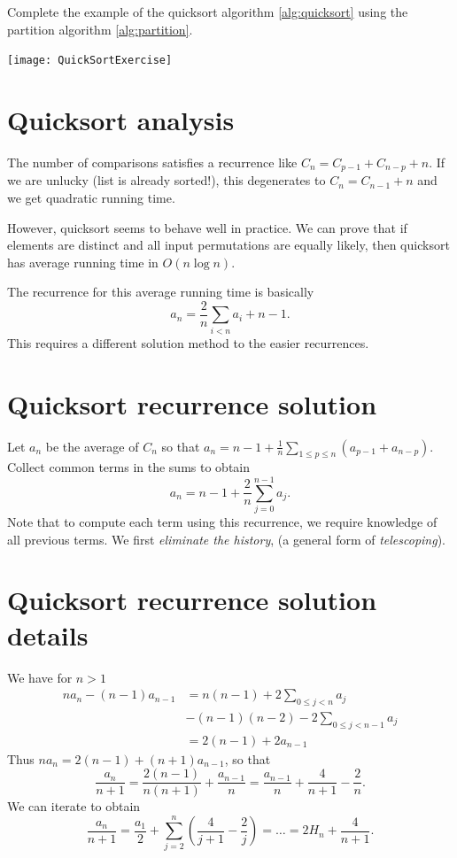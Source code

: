 \begin{Boxample}[2]
Complete the example of the quicksort algorithm \cref{alg:quicksort} using the partition algorithm \cref{alg:partition}.
\begin{center}
\texttt{[image: QuickSortExercise]}
\end{center}
\end{Boxample}

\section{Quicksort analysis}

The number of comparisons satisfies a recurrence like 
$C_n = C_{p-1} + C_{n - p} + n$. If we are unlucky (list is already sorted!), this degenerates to 
$C_{n} = C_{n-1} + n$ and we get quadratic running time.

However, quicksort seems to behave well in practice. We can prove that 
if elements are distinct and all input permutations are equally likely, then 
quicksort has average running time in $O(n \log n)$.

The recurrence for this average running time is basically
$$ a_n = \frac{2}{n} \sum_{i<n} a_i + n-1. $$ 
This requires a different solution method to the easier recurrences.

\section{Quicksort recurrence solution}
Let $a_n$ be the average of $C_n$ so that 
$a_n = n - 1 + \frac{1}{n} \sum_{1\leq p \leq n} (a_{p-1} + a_{n-p})$. 
Collect common terms in the sums to obtain
$$a_n = n - 1 + \frac{2}{n} \sum_{j=0}^{n-1} a_j.$$ 
Note that to compute each term using this recurrence, we require knowledge of all previous terms.
We first \emph{eliminate the history}, (a general form of \emph{telescoping}). 

\section{Quicksort recurrence solution details}
We have for $n>1$
\begin{align*}
na_n - (n-1) a_{n-1} & = n(n-1) + 2 \sum_{0\leq j < n} a_j \\
& - (n-1)(n-2) - 2\sum_{0 \leq j < n - 1} a_j \\
& = 2(n - 1) + 2 a_{n-1}
\end{align*}
Thus $na_n = 2(n - 1) + (n+1)a_{n-1}$, so that 
$$
\frac{a_n}{n+1} = \frac{2(n-1)}{n(n+1)} + \frac{a_{n-1}}{n} = 
\frac{a_{n-1}}{n} + \frac{4}{n+1} - \frac{2}{n}.
$$
We can iterate to obtain
$$\frac{a_n}{n+1} = \frac{a_1}{2} + \sum_{j=2}^n \left(\frac{4}{j+1} - 
\frac{2}{j}\right) = \dots = 2H_n + \frac{4}{n+1}.$$

